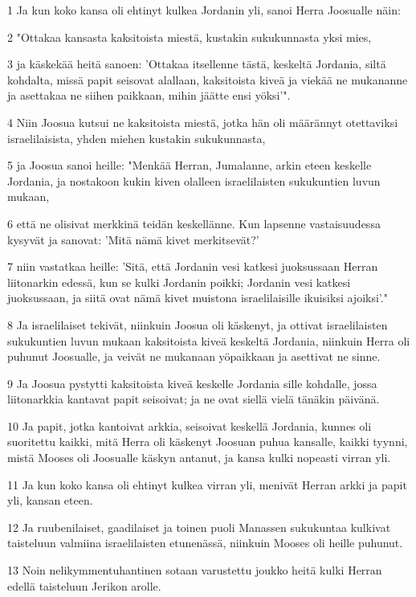 \par 1 Ja kun koko kansa oli ehtinyt kulkea Jordanin yli, sanoi Herra Joosualle näin:
\par 2 "Ottakaa kansasta kaksitoista miestä, kustakin sukukunnasta yksi mies,
\par 3 ja käskekää heitä sanoen: 'Ottakaa itsellenne tästä, keskeltä Jordania, siltä kohdalta, missä papit seisovat alallaan, kaksitoista kiveä ja viekää ne mukananne ja asettakaa ne siihen paikkaan, mihin jäätte ensi yöksi'".
\par 4 Niin Joosua kutsui ne kaksitoista miestä, jotka hän oli määrännyt otettaviksi israelilaisista, yhden miehen kustakin sukukunnasta,
\par 5 ja Joosua sanoi heille: "Menkää Herran, Jumalanne, arkin eteen keskelle Jordania, ja nostakoon kukin kiven olalleen israelilaisten sukukuntien luvun mukaan,
\par 6 että ne olisivat merkkinä teidän keskellänne. Kun lapsenne vastaisuudessa kysyvät ja sanovat: 'Mitä nämä kivet merkitsevät?'
\par 7 niin vastatkaa heille: 'Sitä, että Jordanin vesi katkesi juoksussaan Herran liitonarkin edessä, kun se kulki Jordanin poikki; Jordanin vesi katkesi juoksussaan, ja siitä ovat nämä kivet muistona israelilaisille ikuisiksi ajoiksi'."
\par 8 Ja israelilaiset tekivät, niinkuin Joosua oli käskenyt, ja ottivat israelilaisten sukukuntien luvun mukaan kaksitoista kiveä keskeltä Jordania, niinkuin Herra oli puhunut Joosualle, ja veivät ne mukanaan yöpaikkaan ja asettivat ne sinne.
\par 9 Ja Joosua pystytti kaksitoista kiveä keskelle Jordania sille kohdalle, jossa liitonarkkia kantavat papit seisoivat; ja ne ovat siellä vielä tänäkin päivänä.
\par 10 Ja papit, jotka kantoivat arkkia, seisoivat keskellä Jordania, kunnes oli suoritettu kaikki, mitä Herra oli käskenyt Joosuan puhua kansalle, kaikki tyynni, mistä Mooses oli Joosualle käskyn antanut, ja kansa kulki nopeasti virran yli.
\par 11 Ja kun koko kansa oli ehtinyt kulkea virran yli, menivät Herran arkki ja papit yli, kansan eteen.
\par 12 Ja ruubenilaiset, gaadilaiset ja toinen puoli Manassen sukukuntaa kulkivat taisteluun valmiina israelilaisten etunenässä, niinkuin Mooses oli heille puhunut.
\par 13 Noin nelikymmentuhantinen sotaan varustettu joukko heitä kulki Herran edellä taisteluun Jerikon arolle.
